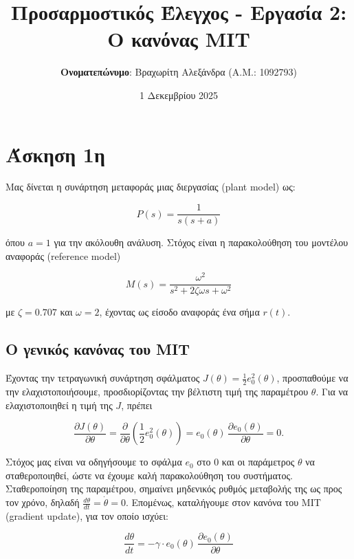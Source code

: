 \documentclass{article}
\title{\textbf{Προσαρμοστικός Έλεγχος - Εργασία 2: Ο κανόνας MIT}}
\author{\textbf{Ονοματεπώνυμο}: Βραχωρίτη Αλεξάνδρα (A.M.: 1092793)}
\date{1 Δεκεμβρίου 2025}
\begin{document}
\maketitle
\section{Άσκηση 1η}
Μας δίνεται η συνάρτηση μεταφοράς μιας διεργασίας (plant model) ως:

\begin{equation}
    P(s) = \frac{1}{s(s+a)}
\end{equation}

\hfill\break
όπου \(a = 1\) για την ακόλουθη ανάλυση. Στόχος είναι η παρακολούθηση του μοντέλου αναφοράς (reference model)

\begin{equation}
    M(s) = \frac{\omega^2}{s^2 + 2 ζ \omega s + \omega^2}
\end{equation}

\hfill\break
με \(ζ = 0.707\) και \(ω = 2\), έχοντας ως είσοδο αναφοράς ένα σήμα \(r(t)\).

\subsection{Ο γενικός κανόνας του MIT}
Έχοντας την τετραγωνική συνάρτηση σφάλματος \(J(\theta) = \frac{1}{2}e_0^2(\theta)\), προσπαθούμε να την ελαχιστοποιήσουμε, προσδιορίζοντας την βέλτιστη τιμή της παραμέτρου \(\theta\). Για να ελαχιστοποιηθεί η τιμή της \(J\), πρέπει

\begin{equation*}
    \frac{\partial J(\theta)}{\partial \theta} = \frac{\partial}{\partial \theta}\left( \frac{1}{2} e_0^2(\theta) \right) = e_0(\theta)\,\frac{\partial e_0(\theta)}{\partial \theta} = 0.
\end{equation*}

\hfill\break
Στόχος μας είναι να οδηγήσουμε το σφάλμα \(e_0\) στο 0 και οι παράμετρος \(\theta\) να σταθεροποιηθεί, ώστε να έχουμε καλή παρακολούθηση του συστήματος. Σταθεροποίηση της παραμέτρου, σημαίνει μηδενικός ρυθμός μεταβολής της ως προς τον χρόνο, δηλαδή \(\frac{d\theta}{dt} = \dot{\theta} = 0\). Επομένως, καταλήγουμε στον κανόνα του MIT (gradient update), για τον οποίο ισχύει:  

\begin{equation*}
    \frac{d\theta}{dt} = -\gamma \cdot e_0(\theta)\,\frac{\partial e_0(\theta)}{\partial \theta}
\end{equation*}
\end{document}
